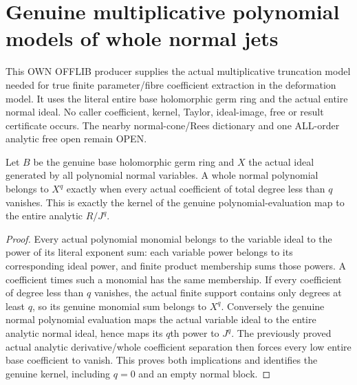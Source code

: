 \section{Genuine multiplicative polynomial models of whole normal jets}
This OWN OFFLIB producer supplies the actual multiplicative truncation model needed for true finite parameter/fibre coefficient extraction in the deformation model. It uses the literal entire base holomorphic germ ring and the actual entire normal ideal. No caller coefficient, kernel, Taylor, ideal-image, free or result certificate occurs. The nearby normal-cone/Rees dictionary and one ALL-order analytic free open remain OPEN.

\begin{lemma}
\label{hir:relative-normal-polynomial-jets-literal-variable-powers}
\leanok
{}
Let $B$ be the genuine base holomorphic germ ring and $X$ the actual ideal generated by all polynomial normal variables. A whole normal polynomial belongs to $X^q$ exactly when every actual coefficient of total degree less than $q$ vanishes. This is exactly the kernel of the genuine polynomial-evaluation map to the entire analytic $R/J^q$.
\end{lemma}
\begin{proof}
Every actual polynomial monomial belongs to the variable ideal to the power of its literal exponent sum: each variable power belongs to its corresponding ideal power, and finite product membership sums those powers. A coefficient times such a monomial has the same membership. If every coefficient of degree less than $q$ vanishes, the actual finite support contains only degrees at least $q$, so its genuine monomial sum belongs to $X^q$. Conversely the genuine normal polynomial evaluation maps the actual variable ideal to the entire analytic normal ideal, hence maps its $q$th power to $J^q$. The previously proved actual analytic derivative/whole coefficient separation then forces every low entire base coefficient to vanish. This proves both implications and identifies the genuine kernel, including $q=0$ and an empty normal block.
\end{proof}

